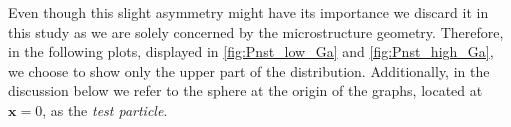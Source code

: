 Even though this slight asymmetry might have its importance \cite{zhang2023evolution} we discard it in this study as we are solely concerned by the microstructure geometry. 
Therefore, in the following plots, displayed in \ref{fig:Pnst_low_Ga} and \ref{fig:Pnst_high_Ga}, we choose to show only the upper part of the distribution.
Additionally, in the discussion below we refer to the sphere at the origin of the graphs, located at $\textbf{x}=0$, as the \textit{test particle}.%


